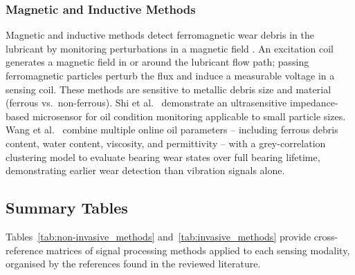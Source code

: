 \subsubsection{Magnetic and Inductive Methods}
\label{subsubsec:magnetic}
Magnetic and inductive methods detect ferromagnetic wear debris in the lubricant by monitoring perturbations in a magnetic field \cite{sun_online_2021,wang_advanced_2024}. An excitation coil generates a magnetic field in or around the lubricant flow path; passing ferromagnetic particles perturb the flux and induce a measurable voltage in a sensing coil. These methods are sensitive to metallic debris size and material (ferrous vs.\ non-ferrous). Shi et al.\ \cite{shi_ultrasensitive_2022} demonstrate an ultrasensitive impedance-based microsensor for oil condition monitoring applicable to small particle sizes. Wang et al.\ \cite{wang_evaluation_2018} combine multiple online oil parameters -- including ferrous debris content, water content, viscosity, and permittivity -- with a grey-correlation clustering model to evaluate bearing wear states over full bearing lifetime, demonstrating earlier wear detection than vibration signals alone.

\subsection{Summary Tables}
\label{subsec:sensing_summary}

Tables~\ref{tab:non-invasive_methods} and~\ref{tab:invasive_methods} provide cross-reference matrices of signal processing methods applied to each sensing modality, organised by the references found in the reviewed literature.

